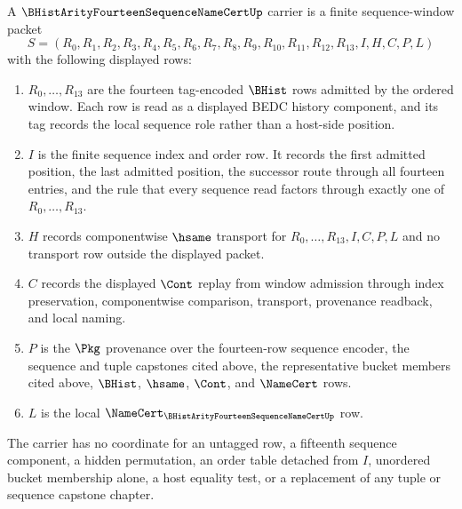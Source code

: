 \begin{definition}
\label{def:b-hist-arity14-sequence-name-cert-window-carrier}
A $\BHistArityFourteenSequenceNameCertUp$ carrier is a finite sequence-window packet
$$
S=(R_0,R_1,R_2,R_3,R_4,R_5,R_6,R_7,R_8,R_9,R_{10},R_{11},R_{12},R_{13},I,H,C,P,L)
$$
with the following displayed rows:
\begin{enumerate}
\item $R_0,\ldots,R_{13}$ are the fourteen tag-encoded $\BHist$ rows admitted by the ordered window. Each row is read as a displayed BEDC history component, and its tag records the local sequence role rather than a host-side position.
\item $I$ is the finite sequence index and order row. It records the first admitted position, the last admitted position, the successor route through all fourteen entries, and the rule that every sequence read factors through exactly one of $R_0,\ldots,R_{13}$.
\item $H$ records componentwise $\hsame$ transport for $R_0,\ldots,R_{13},I,C,P,L$ and no transport row outside the displayed packet.
\item $C$ records the displayed $\Cont$ replay from window admission through index preservation, componentwise comparison, transport, provenance readback, and local naming.
\item $P$ is the $\Pkg$ provenance over the fourteen-row sequence encoder, the sequence and tuple capstones cited above, the representative bucket members cited above, $\BHist$, $\hsame$, $\Cont$, and $\NameCert$ rows.
\item $L$ is the local $\NameCert_{\BHistArityFourteenSequenceNameCertUp}$ row.
\end{enumerate}
The carrier has no coordinate for an untagged row, a fifteenth sequence component, a hidden permutation, an order table detached from $I$, unordered bucket membership alone, a host equality test, or a replacement of any tuple or sequence capstone chapter.
\end{definition}

